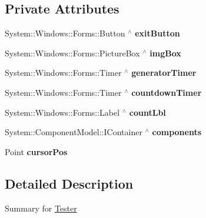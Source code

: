 \subsection*{Private Attributes}
\begin{DoxyCompactItemize}
\item 
\mbox{\label{class_gaze_track_g_u_i_1_1_tester_ad8ab6cca206f013af0205fd7326427cc}} 
System\+::\+Windows\+::\+Forms\+::\+Button $^\wedge$ {\bfseries exit\+Button}
\item 
\mbox{\label{class_gaze_track_g_u_i_1_1_tester_a94dbcde5404ca0a61b9d8d3d1db7d241}} 
System\+::\+Windows\+::\+Forms\+::\+Picture\+Box $^\wedge$ {\bfseries img\+Box}
\item 
\mbox{\label{class_gaze_track_g_u_i_1_1_tester_a6913d8af3a41d24b387d429edbe6d910}} 
System\+::\+Windows\+::\+Forms\+::\+Timer $^\wedge$ {\bfseries generator\+Timer}
\item 
\mbox{\label{class_gaze_track_g_u_i_1_1_tester_a72f511e24714c8fdef4cd1fec72299eb}} 
System\+::\+Windows\+::\+Forms\+::\+Timer $^\wedge$ {\bfseries countdown\+Timer}
\item 
\mbox{\label{class_gaze_track_g_u_i_1_1_tester_af75f068e6faa57091d470f22bab03398}} 
System\+::\+Windows\+::\+Forms\+::\+Label $^\wedge$ {\bfseries count\+Lbl}
\item 
\mbox{\label{class_gaze_track_g_u_i_1_1_tester_a1104a0fbf9f3d6afe8132c29a4bc8ef7}} 
System\+::\+Component\+Model\+::\+I\+Container $^\wedge$ {\bfseries components}
\item 
\mbox{\label{class_gaze_track_g_u_i_1_1_tester_a8082911a9e1adf4545844f1812161546}} 
Point {\bfseries cursor\+Pos}
\end{DoxyCompactItemize}


\subsection{Detailed Description}
Summary for \mbox{\hyperlink{class_gaze_track_g_u_i_1_1_tester}{Tester}} 



